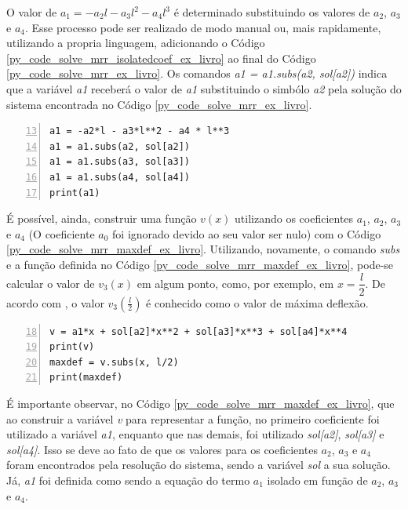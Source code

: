 \documentclass[
	12pt,				%
	openright,			%
    twoside,			%
	a4paper,			%
	english,			%
	french,				%
	spanish,			%
	brazil				%
	]{abntex2}
\numberwithin{lema}{chapter}
\numberwithin{teorema}{chapter}
\numberwithin{definicao}{chapter}
\numberwithin{exemplo}{chapter}
\numberwithin{figure}{chapter}
\begin{document}
O valor de $a_1=-a_2l-a_3l^2-a_4l^3$ é determinado substituindo os valores de $a_2$, $a_3$ e $a_4$. Esse processo pode ser realizado de modo manual ou, mais rapidamente, utilizando a propria linguagem, adicionando o Código \ref{py_code_solve_mrr_isolatedcoef_ex_livro} ao final do Código \ref{py_code_solve_mrr_ex_livro}. Os comandos \textit{a1 = a1.subs(a2, sol[a2])} indica que a variável \textit{a1} receberá o valor de \textit{a1} substituindo o simbólo \textit{a2} pela solução do sistema encontrada no Código \ref{py_code_solve_mrr_ex_livro}.

\begin{lstlisting}[style=Python, xleftmargin=2em, numbers=left, firstnumber=13, caption={Código para a determinação do coeficiente $a_1$ do Exemplo \ref{ex:mrr_ex_livro}}, captionpos=t, label=py_code_solve_mrr_isolatedcoef_ex_livro]
a1 = -a2*l - a3*l**2 - a4 * l**3
a1 = a1.subs(a2, sol[a2])
a1 = a1.subs(a3, sol[a3])
a1 = a1.subs(a4, sol[a4])
print(a1)
\end{lstlisting}

É possível, ainda, construir uma função $v(x)$ utilizando os coeficientes $a_1$, $a_2$, $a_3$ e $a_4$ (O coeficiente $a_0$ foi ignorado devido ao seu valor ser nulo) com o Código \ref{py_code_solve_mrr_maxdef_ex_livro}. Utilizando, novamente, o comando \textit{subs} e a função definida no Código \ref{py_code_solve_mrr_maxdef_ex_livro}, pode-se calcular o valor de $v_3(x)$ em algum ponto, como, por exemplo, em $x=\dfrac{l}{2}$. De acordo com , o valor $v_3(\frac{l}{2})$ é conhecido como o valor de máxima deflexão.

\begin{lstlisting}[style=Python, xleftmargin=2em, numbers=left, firstnumber=18, caption={Código para a definição da função $v_3(x)$ do Exemplo \ref{ex:mrr_ex_livro}}, captionpos=t, label=py_code_solve_mrr_maxdef_ex_livro]
v = a1*x + sol[a2]*x**2 + sol[a3]*x**3 + sol[a4]*x**4
print(v)
maxdef = v.subs(x, l/2)
print(maxdef)
\end{lstlisting}

É importante observar, no Código \ref{py_code_solve_mrr_maxdef_ex_livro}, que ao construir a variável \textit{v} para representar a função, no primeiro coeficiente foi utilizado a variável \textit{a1}, enquanto que nas demais, foi utilizado \textit{sol[a2]}, \textit{sol[a3]} e \textit{sol[a4]}. Isso se deve ao fato de que os valores para os coeficientes $a_2$, $a_3$ e $a_4$ foram encontrados pela resolução do sistema, sendo a variável \textit{sol} a sua solução. Já, \textit{a1} foi definida como sendo a equação do termo $a_1$ isolado em função de $a_2$, $a_3$ e $a_4$.
\end{document}
